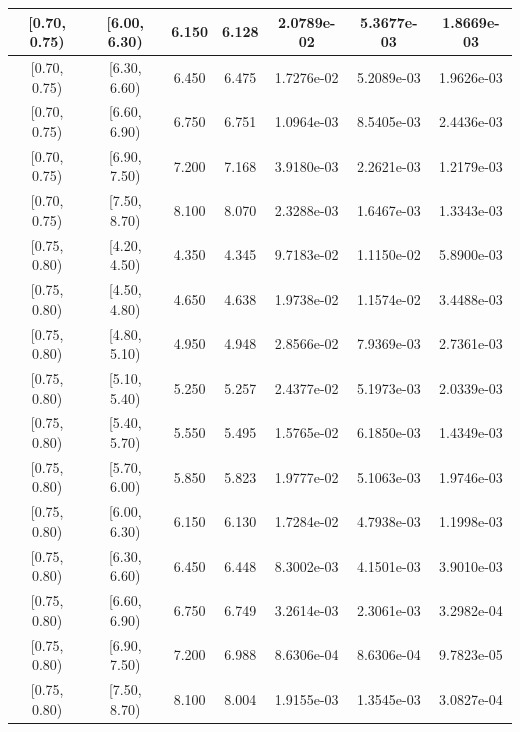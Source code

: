 \begin{longtable}{|c|c|c|c|c|c|c|}
\hline
[0.70, 0.75) & [6.00, 6.30) & 6.150 & 6.128 & 2.0789e-02 & 5.3677e-03 & 1.8669e-03 \\ 
\hline
[0.70, 0.75) & [6.30, 6.60) & 6.450 & 6.475 & 1.7276e-02 & 5.2089e-03 & 1.9626e-03 \\ 
\hline
[0.70, 0.75) & [6.60, 6.90) & 6.750 & 6.751 & 1.0964e-03 & 8.5405e-03 & 2.4436e-03 \\ 
\hline
[0.70, 0.75) & [6.90, 7.50) & 7.200 & 7.168 & 3.9180e-03 & 2.2621e-03 & 1.2179e-03 \\ 
\hline
[0.70, 0.75) & [7.50, 8.70) & 8.100 & 8.070 & 2.3288e-03 & 1.6467e-03 & 1.3343e-03 \\ 
\hline
[0.75, 0.80) & [4.20, 4.50) & 4.350 & 4.345 & 9.7183e-02 & 1.1150e-02 & 5.8900e-03 \\ 
\hline
[0.75, 0.80) & [4.50, 4.80) & 4.650 & 4.638 & 1.9738e-02 & 1.1574e-02 & 3.4488e-03 \\ 
\hline
[0.75, 0.80) & [4.80, 5.10) & 4.950 & 4.948 & 2.8566e-02 & 7.9369e-03 & 2.7361e-03 \\ 
\hline
[0.75, 0.80) & [5.10, 5.40) & 5.250 & 5.257 & 2.4377e-02 & 5.1973e-03 & 2.0339e-03 \\ 
\hline
[0.75, 0.80) & [5.40, 5.70) & 5.550 & 5.495 & 1.5765e-02 & 6.1850e-03 & 1.4349e-03 \\ 
\hline
[0.75, 0.80) & [5.70, 6.00) & 5.850 & 5.823 & 1.9777e-02 & 5.1063e-03 & 1.9746e-03 \\ 
\hline
[0.75, 0.80) & [6.00, 6.30) & 6.150 & 6.130 & 1.7284e-02 & 4.7938e-03 & 1.1998e-03 \\ 
\hline
[0.75, 0.80) & [6.30, 6.60) & 6.450 & 6.448 & 8.3002e-03 & 4.1501e-03 & 3.9010e-03 \\ 
\hline
[0.75, 0.80) & [6.60, 6.90) & 6.750 & 6.749 & 3.2614e-03 & 2.3061e-03 & 3.2982e-04 \\ 
\hline
[0.75, 0.80) & [6.90, 7.50) & 7.200 & 6.988 & 8.6306e-04 & 8.6306e-04 & 9.7823e-05 \\ 
\hline
[0.75, 0.80) & [7.50, 8.70) & 8.100 & 8.004 & 1.9155e-03 & 1.3545e-03 & 3.0827e-04 \\ 
\hline
\end{longtable}
